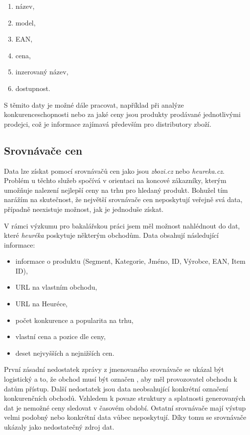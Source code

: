 \documentclass[thesis=B,czech]{FITthesis}[2012/06/26]
\begin{document}
\begin{enumerate}
\item název,
\item model,
\item EAN,
\item cena,
\item inzerovaný název,
\item dostupnost.
\end{enumerate}

S těmito daty je možné dále pracovat, například při analýze konkurenceschopnosti nebo za jaké ceny jsou produkty prodávané
jednotlivými prodejci, což je informace zajímavá především pro distributory zboží.\cite{hunka}

\subsection{Srovnávače cen}

Data lze získat pomocí srovnávačů cen jako jsou \textit{zbozi.cz}\cite{heureka} 
nebo \textit{heureka.cz}\cite{zbozi}. Problém u těchto služeb spočívá v orientaci na koncové zákazníky, kterým umožňuje
nalezení nejlepší ceny na trhu pro hledaný produkt. Bohužel tím narážím na skutečnost, že největší srovnávače cen neposkytují veřejně 
svá data, případně neexistuje možnost, jak je jednoduše získat. 
\par
V rámci výzkumu pro bakalářskou práci jsem měl možnost nahlédnout do dat, které \textit{heuréka} poskytuje některým obchodům.\cite{hunka}
Data obsahují následující informace:


\begin{itemize}
\item informace o produktu (Segment, Kategorie, Jméno, ID, Výrobce, EAN, Item ID),
\item URL na vlastním obchodu,
\item URL na Heuréce,
\item počet konkurence a popularita na trhu,
\item vlastní cena a pozice dle ceny,
\item deset nejvyšších a nejnižších cen.
\end{itemize}

První zásadní nedostatek zprávy z jmenovaného srovnávače se ukázal být logistický a to, že obchod musí být označen ,
aby měl provozovatel obchodu k datům přístup. Další nedostatek jsou data neobsahující konkrétní označení konkurenčních obchodů.\cite{heureka-report}
Vzhledem k povaze struktury a splatnosti generovaných dat je nemožné ceny sledovat v časovém období.
Ostatní srovnávače mají výstup velmi podobný nebo konkrétní data vůbec neposkytují. Díky tomu se srovnávače ukázaly jako nedostatečný zdroj dat.\cite{hunka}
\end{document}
